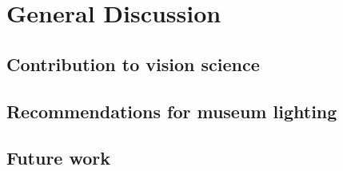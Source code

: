 \chapter{General Discussion}

\section{Contribution to vision science}
\section{Recommendations for museum lighting}
\section{Future work}